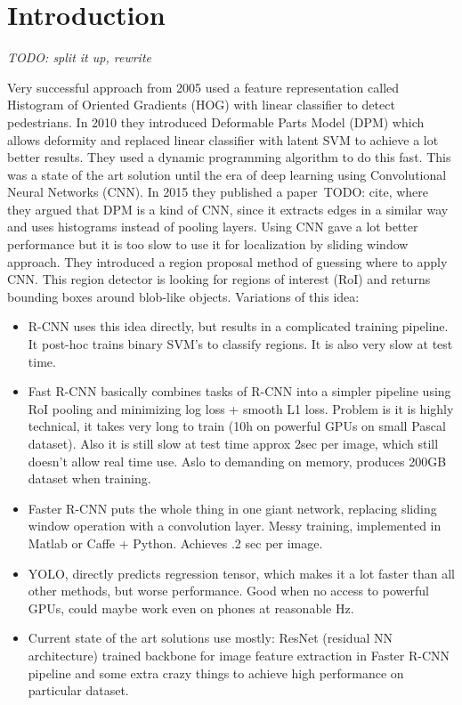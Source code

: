 \section{Introduction}

{\it TODO: split it up, rewrite}

Very successful approach from 2005 used a feature representation called Histogram of Oriented Gradients (HOG) with linear classifier to detect pedestrians. In 2010 they introduced Deformable Parts Model (DPM) which allows deformity and replaced linear classifier with latent SVM to achieve a lot better results. They used a dynamic programming algorithm to do this fast. This was a state of the art solution until the era of deep learning using Convolutional Neural Networks (CNN). In 2015 they published a paper~TODO: cite, where they argued that DPM is a kind of CNN, since it extracts edges in a similar way and uses histograms instead of pooling layers. Using CNN gave a lot better performance but it is too slow to use it for localization by sliding window approach. They introduced a region proposal method of guessing where to apply CNN. This region detector is looking for regions of interest (RoI) and returns bounding boxes around blob-like objects. Variations of this idea:
\begin{itemize}
\item R-CNN uses this idea directly, but results in a complicated training pipeline. It post-hoc trains binary SVM’s to classify regions. It is also very slow at test time. 
\item Fast R-CNN basically combines tasks of R-CNN into a simpler pipeline using RoI pooling and minimizing log loss + smooth L1 loss. Problem is it is highly technical, it takes very long to train (10h on powerful GPUs on small Pascal dataset). Also it is still slow at test time approx 2sec per image, which still doesn’t allow real time use. Aslo to demanding on memory, produces 200GB dataset when training.
\item Faster R-CNN puts the whole thing in one giant network, replacing sliding window operation with a convolution layer. Messy training, implemented in Matlab or Caffe + Python. Achieves .2 sec per image.
\item YOLO, directly predicts regression tensor, which makes it a lot faster than all other methods, but worse performance. Good when no access to powerful GPUs, could maybe work even on phones at reasonable Hz.
\item Current state of the art solutions use mostly: ResNet (residual NN architecture) trained backbone for image feature extraction in Faster R-CNN pipeline and some extra crazy things to achieve high performance on particular dataset.
\end{itemize}

